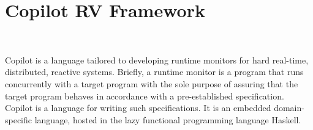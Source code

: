 \section{Copilot RV Framework}~\label{sec:Copilot}


Copilot is a language tailored to developing runtime monitors for hard
real-time, distributed, reactive systems. Briefly, a runtime monitor is a
program that runs concurrently with a target program with the sole purpose of
assuring that the target program behaves in accordance with a pre-established
specification\citep{monitors}. Copilot is a language for writing such
specifications\citep{copilot, pike-icfp-12, pike-isse-13}. It is an embedded
domain-specific language, hosted in the lazy functional programming language
Haskell.


